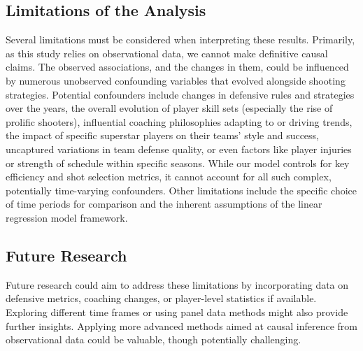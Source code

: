\documentclass[11pt, a4paper]{article} %
\begin{document}
\subsection{Limitations of the Analysis} %
Several limitations must be considered when interpreting these results. Primarily, as this study relies on observational data, 
we cannot make definitive causal claims. The observed associations, and the changes in them, could be influenced by numerous 
unobserved confounding variables that evolved alongside shooting strategies. Potential confounders include changes in defensive 
rules and strategies over the years, the overall evolution of player skill sets (especially the rise of prolific shooters), 
influential coaching philosophies adapting to or driving trends, the impact of specific superstar players on their teams' style 
and success, uncaptured variations in team defense quality, or even factors like player injuries or strength of schedule within 
specific seasons. While our model controls for key efficiency and shot selection metrics, it cannot account for all such complex, 
potentially time-varying confounders. Other limitations include the specific choice of time periods for comparison and the inherent 
assumptions of the linear regression model framework.

\subsection{Future Research} %
Future research could aim to address these limitations by incorporating data on defensive metrics, coaching changes, or player-level statistics if available. Exploring different time frames or using panel data methods might also provide further insights. Applying more advanced methods aimed at causal inference from observational data could be valuable, though potentially challenging.


\newpage %
%
\end{document}
